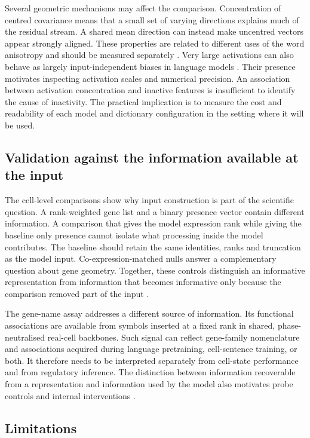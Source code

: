 \documentclass[review,authoryear,12pt]{elsarticle}
\begin{document}
Several geometric mechanisms may affect the comparison. Concentration of centred covariance means
that a small set of varying directions explains much of the residual stream. A shared mean direction
can instead make uncentred vectors appear strongly aligned. These properties are related to different
uses of the word anisotropy and should be measured separately \citep{refAnisotropy}.
Very large activations can also behave as largely input-independent biases in language models
\citep{refMassiveActivations}. Their presence motivates inspecting activation scales and numerical
precision. An association between activation concentration and inactive features is insufficient to
identify the cause of inactivity. The practical implication is to measure the cost and readability
of each model and dictionary configuration in the setting where it will be used.

\subsection{Validation against the information available at the input}

The cell-level comparisons show why input construction is part of the scientific question.
A rank-weighted gene list and a binary presence vector contain different information. A comparison
that gives the model expression rank while giving the baseline only presence cannot isolate what
processing inside the model contributes. The baseline should retain the same identities, ranks and
truncation as the model input. Co-expression-matched nulls answer a complementary question about
gene geometry. Together, these controls distinguish an informative representation from information
that becomes informative only because the comparison removed part of the input
\citep{ref5,ref9,ref39,ref40}.

The gene-name assay addresses a different source of information. Its functional associations are
available from symbols inserted at a fixed rank in shared, phase-neutralised real-cell backbones. Such signal
can reflect gene-family nomenclature and associations acquired during language pretraining,
cell-sentence training, or both. It therefore needs to be interpreted separately from cell-state
performance and from regulatory inference. The distinction between information recoverable from a
representation and information used by the model also motivates probe controls and internal
interventions \citep{refProbeControls,refCausalMediation}.

\subsection{Limitations}
\label{sec:limits}
\end{document}
